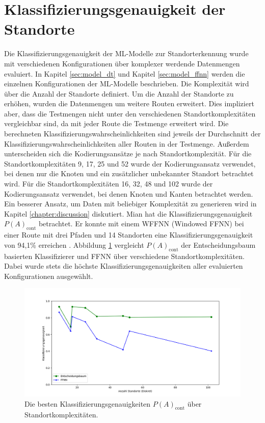 \section{Klassifizierungsgenauigkeit der Standorte}
Die Klassifizierungsgenauigkeit der ML-Modelle zur Standorterkennung wurde mit verschiedenen Konfigurationen über komplexer werdende Datenmengen evaluiert.
In Kapitel \ref{sec:model_dt} und Kapitel \ref{sec:model_ffnn} werden die einzelnen Konfigurationen der ML-Modelle beschrieben.
Die Komplexität wird über die Anzahl der Standorte definiert.
Um die Anzahl der Standorte zu erhöhen, wurden die Datenmengen um weitere Routen erweitert.
Dies impliziert aber, dass die Testmengen nicht unter den verschiedenen Standortkomplexitäten vergleichbar sind, da mit jeder Route die Testmenge erweitert wird.
Die berechneten Klassifizierungswahrscheinlichkeiten sind jeweils der Durchschnitt der Klassifizierungswahrscheinlichkeiten aller Routen in der Testmenge.
\newline
\newline
Außerdem unterscheiden sich die Kodierungsansätze je nach Standortkomplexität.
Für die Standortkomplexitäten 9, 17, 25 und 52 wurde der Kodierungsansatz verwendet, bei denen nur die Knoten und ein zusätzlicher unbekannter Standort betrachtet wird.
Für die Standortkomplexitäten 16, 32, 48 und 102 wurde der Kodierungsansatz verwendet, bei denen Knoten und Kanten betrachtet werden.
Ein besserer Ansatz, um Daten mit beliebiger Komplexität zu generieren wird in Kapitel \ref{chapter:discussion} diskutiert.
\newline
\newline
Mian hat die Klassifizierungsgenauigkeit $P(A)_{\text{cont}}$ betrachtet.
Er konnte mit einem WFFNN (Windowed FFNN) bei einer Route mit drei Pfaden und 14 Standorten eine Klassifizierungsgenauigkeit von 94,1\% erreichen \cite{naveedThesis}.
Abbildung \ref{fig:best_dt_acc_vs_knn_using_cont} vergleicht $P(A)_{\text{cont}}$ der Entscheidungsbaum basierten Klassifizierer und FFNN über verschiedene Standortkomplexitäten.
Dabei wurde stets die höchste Klassifizierungsgenauigkeiten aller evaluierten Konfigurationen ausgewählt.
\begin{figure}[h!]
    \centering
    \includegraphics[width=\linewidth]{images/best_dt_vs_best_ffnn_over_num_loc_using_acc_cont.png}
    \caption{Die besten Klassifizierungsgenauigkeiten $P(A)_{\text{cont}}$ über Standortkomplexitäten.}
    \label{fig:best_dt_acc_vs_knn_using_cont}
\end{figure}
